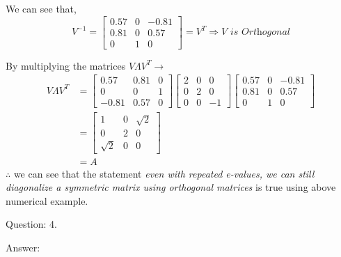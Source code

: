 \documentclass[a4paper]{article}
\begin{document}
\begin{qalist}
			We can see that, 
			\begin{equation}
				{V}^{-1} = \begin{bmatrix}0.57 & 0 & -0.81 \\ 0.81 & 0 & 0.57 \\ 0 & 1 & 0 \end{bmatrix} = {V}^{T} \Rightarrow \textit{$V$ is Orthogonal}
			\end{equation}
			
			By multiplying the matrices $V \Lambda {V}^{T} \rightarrow$ 
			\begin{align}
				V \Lambda {V}^{T} &=  \begin{bmatrix} 0.57 & 0.81 & 0 \\ 0 & 0 & 1 \\ -0.81 & 0.57 & 0 \end{bmatrix}   \begin{bmatrix} 2 & 0 & 0\\ 0 & 2 & 0 \\ 0 & 0 & -1 \end{bmatrix}    \begin{bmatrix}0.57 & 0 & -0.81 \\ 0.81 & 0 & 0.57 \\ 0 & 1 & 0 \end{bmatrix} \\ 
				&=  \begin{bmatrix}1 & 0 & \sqrt{2} \\ 0 & 2 & 0 \\ \sqrt{2} & 0 & 0\end{bmatrix} \\ 
				&= A
			\end{align}
			$\therefore$ we can see that the statement \emph{even with repeated e-values, we can still diagonalize a symmetric matrix using orthogonal matrices} is true using above numerical example.
			
			
		\item[Question: 4.] \setcounter{equation}{0}
		\item[Answer:]
	\end{qalist}
\end{document}
